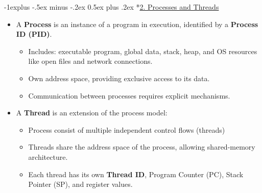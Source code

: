 \documentclass[10pt,landscape]{article}
\makeatletter
\renewcommand{\subsection}{\@startsection{subsection}{2}{0mm}%
                                {-1explus -.5ex minus -.2ex}%
                                {0.5ex plus .2ex}%
                                {\normalfont\normalsize\bfseries}}
\makeatother
\begin{document}
\begin{multicols*}{3}
\subsection*{\underline{2. Processes and Threads}}
\begin{itemize}[topsep=0pt,noitemsep,wide=0pt, leftmargin=\dimexpr{} + 2\relax]
    \item A \textbf{Process} is an instance of a program in execution, identified by a \textbf{Process ID (PID)}.
    \begin{itemize}[topsep=0pt,noitemsep,wide=0pt, leftmargin=\dimexpr{} + 2\relax]
        \item Includes: executable program, global data, stack, heap, and OS resources like open files and network connections.
        \item Own address space, providing exclusive access to its data.
        \item Communication between processes requires explicit mechanisms.
    \end{itemize}
    \item A \textbf{Thread} is an extension of the process model:
    \begin{itemize}[topsep=0pt,noitemsep,wide=0pt, leftmargin=\dimexpr{} + 2\relax]
        \item Process consist of multiple independent control flows (threads)
        \item Threads share the address space of the process, allowing shared-memory architecture.
        \item Each thread has its own \textbf{Thread ID}, Program Counter (PC), Stack Pointer (SP), and register values.
    \end{itemize}
\end{itemize}


\end{multicols*}
\end{document}
